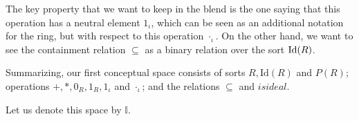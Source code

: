 The key property that
we want to keep in the blend is the one saying that this operation
has a neutral element $1_{\iota}$, which can be seen as an additional
notation for the ring, but with respect to this operation $\cdot_{\iota}$.
%
On the other hand, we want to see the containment relation $\subseteq$
as a binary relation over the sort ${\rm Id}(R)$.

Summarizing, our first conceptual space consists of sorts $R,
\textrm{Id}(R)$ and $P(R)$; operations $+, *, 0_R, 1_R, 1_{\iota}$ and
$ \cdot_{\iota}$; and the relations $\subseteq$ and $isideal$.



 
Let us denote this space by $\mathbb{I}$.

